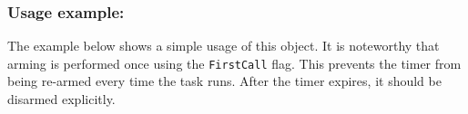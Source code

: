 \noindent\hrulefill

\subsubsection*{Usage example:}
The example below shows a simple usage of this object. It is noteworthy that arming is performed once using the \lstinline{FirstCall} flag. This prevents the timer from being re-armed every time the task runs. After the timer expires, it should be disarmed explicitly.
\medskip


